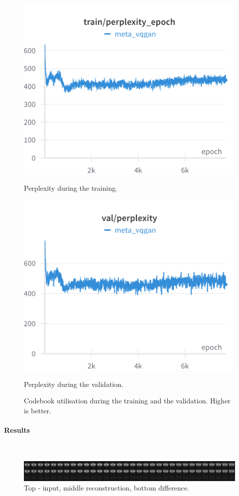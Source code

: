 \begin{figure}[H]
\includegraphics[width=\linewidth]{detailed_engineering/Meta VQGAN/charts/Section-2-Panel-1-5nrgzgmoj.png}
\caption{Perplexity during the training.}
\endminipage\hfill
{}
\includegraphics[width=\linewidth]{detailed_engineering/Meta VQGAN/charts/Section-4-Panel-1-njiwngfn7.png}
\caption{Perplexity during the validation.}
\endminipage
\caption{Codebook utilisation during the training and the validation. Higher is better.}
\end{figure}

\paragraph{Results}\mbox{}\\

\begin{figure}[H]
    \centering
    \includegraphics[width=\linewidth]{reports/meta_vqgan_reconstruction_comparison.png}
    \caption{Top - input, middle reconstruction, bottom difference.}
    \label{fig:enter-label}
\end{figure}

